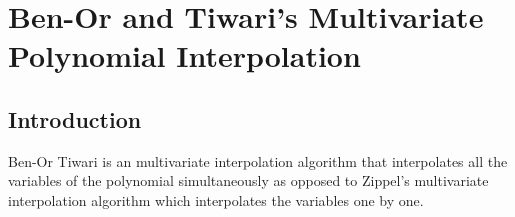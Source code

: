 \chapter{Ben-Or and Tiwari's Multivariate Polynomial Interpolation}
\section{Introduction}
Ben-Or Tiwari is an multivariate interpolation algorithm that interpolates 
all the variables of the polynomial simultaneously as opposed to Zippel's multivariate
interpolation algorithm which interpolates the variables one by one. 

